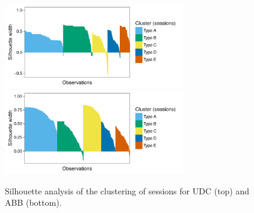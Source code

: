 \begin{figure}[!ht]
	\caption{Silhouette analysis of the clustering of sessions for UDC (top) and ABB (bottom).}
	\centering		
	\includegraphics[width=0.7\textwidth]{Figures/UDC_silhouette_sessions}
	\includegraphics[width=0.7\textwidth]{Figures/ABB_silhouette_sessions}	
	\label{silhouette_sessions}
\end{figure}


